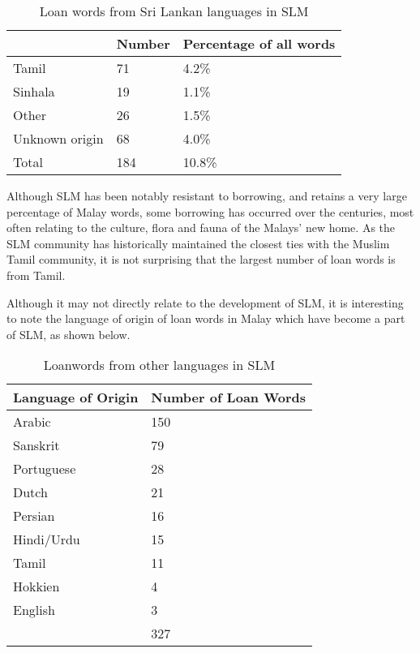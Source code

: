 \begin{table}
\centering
\begin{tabular}{lll}
 &
\textbf{Number} &
\textbf{Percentage of all words}\\\hline
Tamil &
71 &
 4.2\%\\
Sinhala &
19 &
 1.1\%\\
Other\footnotemark{} &
26 &
 1.5\%\\
Unknown origin\footnotemark{} &
68 &
 4.0\%\\\hline
Total &
184 &
10.8\%\\
\end{tabular}
\caption{Loan words from Sri Lankan languages in SLM}
\label{paauw:tab:slloanwords}
\end{table}
\addtocounter{footnote}{-2}
Although SLM has been notably resistant to borrowing, and retains a very large percentage of Malay words, some borrowing has occurred over the centuries, most often relating to the culture, flora and fauna of the Malays' new home. As the SLM community has historically maintained the closest ties with the Muslim Tamil community, it is not surprising that the largest number of loan words is from Tamil.

Although it may not directly relate to the development of SLM, it is interesting to note the language of origin of loan words in Malay which have become a part of SLM, as shown below.

\begin{table}
\centering
\begin{tabular}{ll}
\textbf{Language of Origin} &
\textbf{Number of Loan Words}\\\hline
Arabic &
150\\
Sanskrit &
 79\\
Portuguese &
 28\\
Dutch &
 21\\
Persian &
 16\\
Hindi/Urdu &
 15\\
Tamil &
 11\\
Hokkien &
 4\\
English &
 3\\\hline
 &
327\\
\end{tabular}
\caption{Loanwords from other languages in SLM}
\label{paauw:tab:otherloanwords}
\end{table}

